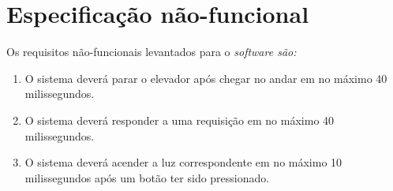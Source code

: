 \section{Especificação não-funcional}

Os requisitos não-funcionais levantados para o \it{software} são:

\begin{enumerate}[label=RNF \arabic*. , ref=\arabic*]
	\item O sistema deverá parar o elevador após chegar no andar em no máximo 40 milissegundos.
  \item O sistema deverá responder a uma requisição em no máximo 40 milissegundos.
  \item O sistema deverá acender a luz correspondente em no máximo 10 milissegundos após um botão ter sido pressionado.
\end{enumerate}








